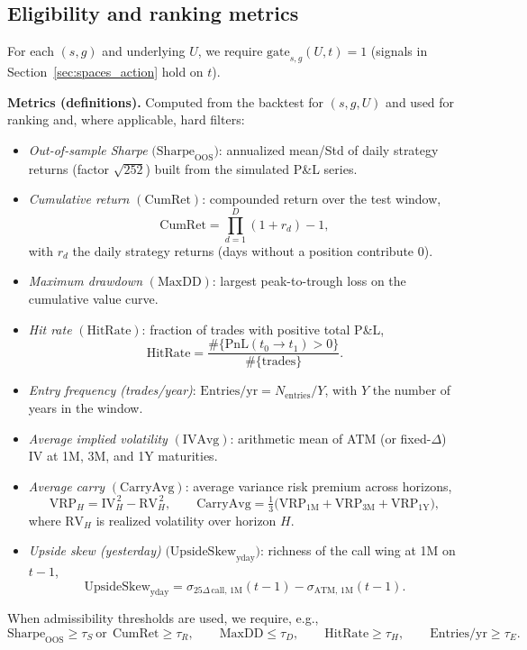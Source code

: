 \documentclass[12pt,a4paper]{report}
\begin{document}
\subsection{Eligibility and ranking metrics}
For each $(s,g)$ and underlying $U$, we require $\text{gate}_{s,g}(U,t)=1$ (signals in Section~\ref{sec:spaces_action} hold on $t$).

\medskip
\noindent\textbf{Metrics (definitions).} Computed from the backtest for $(s,g,U)$ and used for ranking and, where applicable, hard filters:
\begin{itemize}
    \item \emph{Out-of-sample Sharpe} $\big(\mathrm{Sharpe}_{\text{OOS}}\big)$: annualized mean/Std of daily strategy returns (factor $\sqrt{252}$) built from the simulated P\&L series.
    \item \emph{Cumulative return} $(\mathrm{CumRet})$: compounded return over the test window,
    \[
      \mathrm{CumRet}=\prod_{d=1}^{D}(1+r_d)-1,
    \]
    with $r_d$ the daily strategy returns (days without a position contribute $0$).
    \item \emph{Maximum drawdown} $(\mathrm{MaxDD})$: largest peak-to-trough loss on the cumulative value curve.
    \item \emph{Hit rate} $(\mathrm{HitRate})$: fraction of trades with positive total P\&L,
    \[
      \mathrm{HitRate}=\frac{\#\{\mathrm{PnL}(t_0\!\to\!t_1)>0\}}{\#\{\text{trades}\}}.
    \]
    \item \emph{Entry frequency (trades/year)}: $\mathrm{Entries/yr}=N_{\text{entries}}/Y$, with $Y$ the number of years in the window.
    \item \emph{Average implied volatility} $(\mathrm{IVAvg})$: arithmetic mean of ATM (or fixed-$\Delta$) IV at 1M, 3M, and 1Y maturities.
    \item \emph{Average carry} $(\mathrm{CarryAvg})$: average variance risk premium across horizons,
    \[
      \mathrm{VRP}_H=\mathrm{IV}_H^{\,2}-\mathrm{RV}_H^{\,2}, \qquad
      \mathrm{CarryAvg}=\tfrac{1}{3}\big(\mathrm{VRP}_{1\mathrm{M}}+\mathrm{VRP}_{3\mathrm{M}}+\mathrm{VRP}_{1\mathrm{Y}}\big),
    \]
    where $\mathrm{RV}_H$ is realized volatility over horizon $H$.
    \item \emph{Upside skew (yesterday)} $\big(\mathrm{UpsideSkew}_{\text{yday}}\big)$: richness of the call wing at 1M on $t\!-\!1$,
    \[
      \mathrm{UpsideSkew}_{\text{yday}}=\sigma_{25\Delta\,\text{call},\,1\mathrm{M}}(t\!-\!1)-\sigma_{\mathrm{ATM},\,1\mathrm{M}}(t\!-\!1).
    \]
\end{itemize}
When admissibility thresholds are used, we require, e.g.,
\[
  \mathrm{Sharpe}_{\text{OOS}} \ge \tau_S \ \text{or}\ \ \mathrm{CumRet} \ge \tau_R,\qquad
  \mathrm{MaxDD} \le \tau_D,\qquad
  \mathrm{HitRate} \ge \tau_H,\qquad
  \mathrm{Entries/yr} \ge \tau_E.
\]
\end{document}
